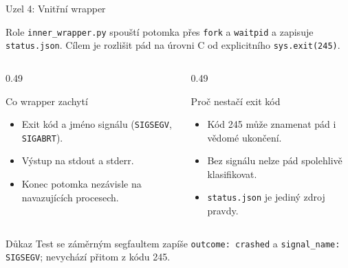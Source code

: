 \documentclass[aspectratio=169,11pt]{beamer}
\begin{document}
\begin{frame}[t]{Uzel 4: Vnitřní wrapper}
  \small
  \begin{block}{Role}
    \texttt{inner\_wrapper.py} spouští potomka přes \texttt{fork} a
    \texttt{waitpid} a zapisuje \texttt{status.json}. Cílem je rozlišit pád na
    úrovni C od explicitního \texttt{sys.exit(245)}.
  \end{block}

  \begin{columns}[T,onlytextwidth]
    \begin{column}{0.49\textwidth}
      \begin{block}{Co wrapper zachytí}
        \begin{itemize}
          \item Exit kód a jméno signálu (\texttt{SIGSEGV}, \texttt{SIGABRT}).
          \item Výstup na stdout a stderr.
          \item Konec potomka nezávisle na navazujících procesech.
        \end{itemize}
      \end{block}
    \end{column}
    \begin{column}{0.49\textwidth}
      \begin{block}{Proč nestačí exit kód}
        \begin{itemize}
          \item Kód 245 může znamenat pád i vědomé ukončení.
          \item Bez signálu nelze pád spolehlivě klasifikovat.
          \item \texttt{status.json} je jediný zdroj pravdy.
        \end{itemize}
      \end{block}
    \end{column}
  \end{columns}

  \begin{alertblock}{Důkaz}
    Test se záměrným segfaultem zapíše \texttt{outcome: crashed} a
    \texttt{signal\_name: SIGSEGV}; nevychází přitom z kódu 245.
  \end{alertblock}
\end{frame}
\end{document}
